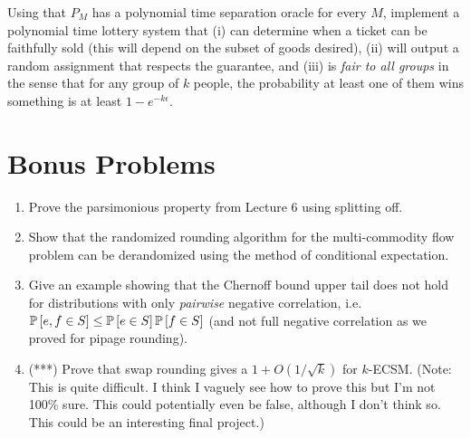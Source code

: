 Using that $P_M$ has a polynomial time separation oracle for every $M$, implement a polynomial time lottery system that (i) can determine when a ticket can be faithfully sold (this will depend on the subset of goods desired), (ii) will output a random assignment that respects the guarantee, and (iii) is \textit{fair to all groups} in the sense that for any group of $k$ people, the probability at least one of them wins something is at least $1-e^{-k\epsilon}$.

\section{Bonus Problems} 

\begin{enumerate}
	\item Prove the parsimonious property from Lecture 6 using splitting off. 
	\item Show that the randomized rounding algorithm for the multi-commodity flow problem can be derandomized using the method of conditional expectation.
	\item Give an example showing that the Chernoff bound upper tail does not hold for distributions with only \textit{pairwise} negative correlation, i.e. $\P{e,f \in S} \le \P{e \in S}\P{f \in S}$ (and not full negative correlation as we proved for pipage rounding). 
	\item (***) Prove that swap rounding gives a $1+O(1/\sqrt{k})$ for $k$-ECSM. (Note: This is quite difficult. I think I vaguely see how to prove this but I'm not 100\% sure. This could potentially even be false, although I don't think so. This could be an interesting final project.)
\end{enumerate}

